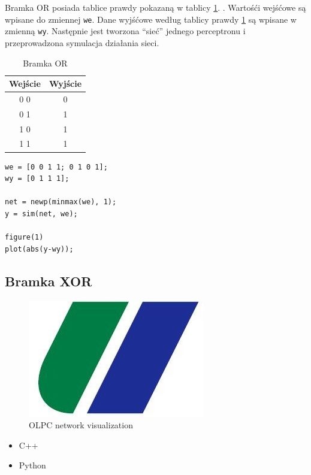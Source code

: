 \documentclass[pointlessnumbers, abstracton, headsepline, a4paper]{scrartcl}
\begin{document}
Bramka OR posiada tablice prawdy pokazaną w tablicy \ref{tab:or}. . Wartośći wejśćowe są wpisane do zmiennej \texttt{we}. Dane wyjśćowe według tablicy prawdy \ref{tab:or} są wpisane w zmienną \texttt{wy}. Następnie jest tworzona ``sieć'' jednego perceptronu i przeprowadzona symulacja działania sieci.

\begin{table}
\begin{center}
\begin{tabular}[t]{c|c}
Wejście & Wyjście \\
\hline
0 0 & 0 \\
0 1 & 1 \\
1 0 & 1 \\
1 1 & 1 \\
\end{tabular}
\end{center}
\caption{\label{tab:or}Bramka OR}
\end{table}

\begin{lstlisting}[caption={uczenie_or.m}, label=lst:bramka_or]
we = [0 0 1 1; 0 1 0 1];
wy = [0 1 1 1];

net = newp(minmax(we), 1);
y = sim(net, we);

figure(1)
plot(abs(y-wy));
\end{lstlisting}

\subsection{Bramka XOR}

\begin{figure}
\begin{center}
\includegraphics[scale=0.6]{logos/zut2}
\par
\end{center}
\caption{\label{fig:OLPC-network-visualization}OLPC network visualization}
\end{figure}

\begin{itemize}
\item C++
\item Python
\end{itemize}
\end{document}
